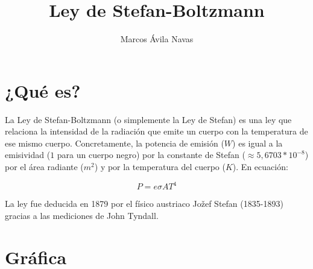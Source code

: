 \documentclass{article}
\title{Ley de Stefan-Boltzmann}
\author{Marcos Ávila Navas}
\date{\date{}}
\begin{document}
\maketitle

\section{¿Qué es?}

La Ley de Stefan-Boltzmann (o simplemente la Ley de Stefan) es una ley que relaciona la intensidad de la radiación que emite un cuerpo con la temperatura de ese mismo cuerpo. Concretamente, la potencia de emisión ($W$) es igual a la emisividad ($1$ para un cuerpo negro) por la constante de Stefan ($\approx 5,6703*10^{-8}$) por el área radiante ($m^{2}$) y por la temperatura del cuerpo ($K$). En ecuación:

\[P = e \sigma A T^{4} \]

La ley fue deducida en 1879 por el físico austriaco Jožef Stefan (1835-1893) gracias a las mediciones de John Tyndall.

\section{Gráfica}
\end{document}
